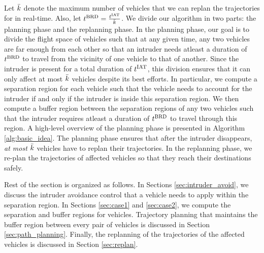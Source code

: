 Let $\bar{k}$ denote the maximum number of vehicles that we can replan the trajectories for in real-time. Also, let $t^\text{BRD} = \frac{t^\text{IAT}}{\bar{k}}$. We divide our algorithm in two parts: the planning phase and the replanning phase. In the planning phase, our goal is to divide the flight space of vehicles such that at any given time, any two vehicles are far enough from each other so that an intruder needs atleast a duration of $t^\text{BRD}$ to travel from the vicinity of one vehicle to that of another. Since the intruder is present for a total duration of $t^\text{IAT}$, this division ensures that it can only affect at most $\bar{k}$ vehicles despite its best efforts. In particular, we compute a separation region for each vehicle such that the vehicle needs to account for the intruder if and only if the intruder is inside this separation region. We then compute a buffer region between the separation regions of any two vehicles such that the intruder requires atleast a duration of $t^\text{BRD}$ to travel through this region. A high-level overview of the planning phase is presented in Algorithm \ref{alg:basic_idea}. The planning phase ensures that after the intruder disappears, \textit{at most $\bar{k}$} vehicles have to replan their trajectories. In the replanning phase, we re-plan the trajectories of affected vehicles so that they reach their destinations safely. %

Rest of the section is organized as follows. In Sections \ref{sec:intruder_avoid}, we discuss the intruder avoidance control that a vehicle needs to apply within the separation region. In Sections \ref{sec:case1} and \ref{sec:case2}, we compute the separation and buffer regions for vehicles. 
Trajectory planning that maintains the buffer region between every pair of vehicles is discussed in Section \ref{sec:path_planning}. Finally, the replanning of the trajectories of the affected vehicles is discussed in Section \ref{sec:replan}. 
